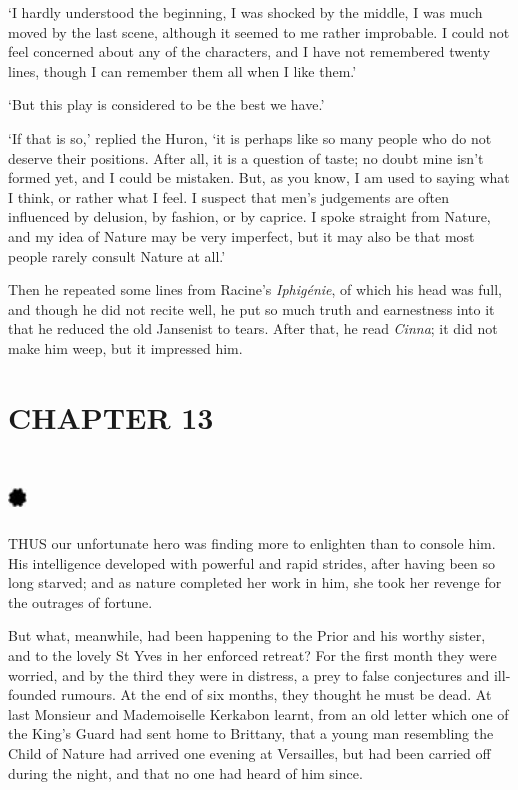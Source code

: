 \documentclass{article}
\begin{document}
\begin{center}
`I hardly understood the beginning, I was shocked by the middle, I was much moved 
by the last scene, although it seemed to me rather improbable. I could not feel 
concerned about any of the characters, and I have not remembered twenty lines, 
though I can remember them all when I like them.' 

`But this play is considered to be the best we have.' 

`If that is so,' replied the Huron, `it is perhaps like so many people who do not 
deserve their positions. After all, it is a question of taste; no doubt mine isn't 
formed yet, and I could be mistaken. But, as you know, I am used to saying what 
I think, or rather what I feel. I suspect that men's judgements are often influenced 
by delusion, by fashion, or by caprice. I spoke straight from Nature, and my idea 
of Nature may be very imperfect, but it may also be that most people rarely consult 
Nature at all.' 

Then he repeated some lines from Racine's \textit{Iphigénie}, of which his head 
was full, and though he did not recite well, he put so much truth and earnestness 
into it that he reduced the old Jansenist to tears. After that, he read \textit{Cinna}; 
it did not make him weep, but it impressed him.\pagebreak{} 

\section*{\textbf{CHAPTER 13  }}

\section*{%
\includegraphics[width=14pt, height=15pt, keepaspectratio=true]{Zadig or L'Ingenu - Voltaire-fig035.jpg}
}

 

THUS our unfortunate hero was finding more to enlighten than to console him. His 
intelligence developed with powerful and rapid strides, after having been so long 
starved; and as nature completed her work in him, she took her revenge for the 
outrages of fortune. 

But what, meanwhile, had been happening to the Prior and his worthy sister, and 
to the lovely St Yves in her enforced retreat? For the first month they were worried, 
and by the third they were in distress, a prey to false conjectures and ill-founded 
rumours. At the end of six months, they thought he must be dead. At last Monsieur 
and Mademoiselle Kerkabon learnt, from an old letter which one of the King's Guard 
had sent home to Brittany, that a young man resembling the Child of Nature had 
arrived one evening at Versailles, but had been carried off during the night, and 
that no one had heard of him since. 


\end{center}
\end{document}
